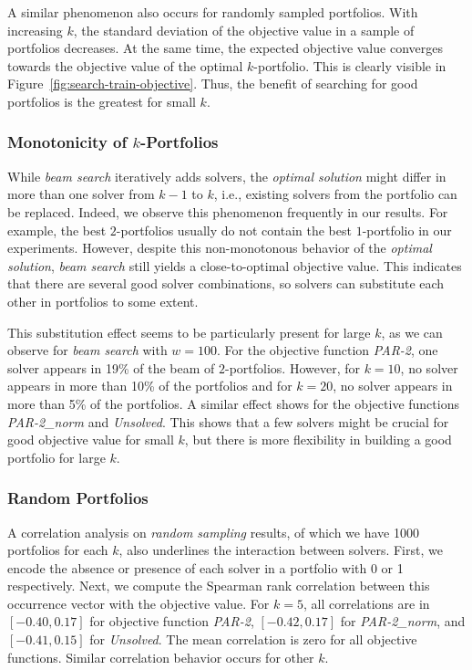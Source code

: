 \documentclass[conference]{IEEEtran}
\begin{document}
A similar phenomenon also occurs for randomly sampled portfolios. 
With increasing $k$, the standard deviation of the objective value in a sample of portfolios decreases.
At the same time, the expected objective value converges towards the objective value of the optimal $k$-portfolio.
This is clearly visible in Figure~\ref{fig:search-train-objective}.
Thus, the benefit of searching for good portfolios is the greatest for small $k$.

\subsubsection{Monotonicity of $k$-Portfolios}

While \emph{beam search} iteratively adds solvers, the \emph{optimal solution} might differ in more than one solver from $k-1$ to $k$, i.e., existing solvers from the portfolio can be replaced.
Indeed, we observe this phenomenon frequently in our results.
For example, the best $2$-portfolios usually do not contain the best $1$-portfolio in our experiments.
However, despite this non-monotonous behavior of the \emph{optimal solution}, \emph{beam search} still yields a close-to-optimal objective value.
This indicates that there are several good solver combinations, so solvers can substitute each other in portfolios to some extent.

This substitution effect seems to be particularly present for large $k$, as we can observe for \emph{beam search} with $w=100$. 
For the objective function \emph{PAR-2}, one solver appears in 19\% of the beam of $2$-portfolios.
However, for $k=10$, no solver appears in more than 10\% of the portfolios and for $k=20$, no solver appears in more than 5\% of the portfolios.
A similar effect shows for the objective functions \emph{PAR-2\_norm} and \emph{Unsolved}.
This shows that a few solvers might be crucial for good objective value for small $k$, but there is more flexibility in building a good portfolio for large $k$.

\subsubsection{Random Portfolios}

A correlation analysis on \emph{random sampling} results, of which we have 1000 portfolios for each $k$, also underlines the interaction between solvers.
First, we encode the absence or presence of each solver in a portfolio with 0 or 1 respectively.
Next, we compute the Spearman rank correlation between this occurrence vector with the objective value.
For $k=5$, all correlations are in $[-0.40,0.17]$ for objective function \emph{PAR-2}, $[-0.42,0.17]$ for \emph{PAR-2\_norm}, and $[-0.41,0.15]$ for \emph{Unsolved}.
The mean correlation is zero for all objective functions.
Similar correlation behavior occurs for other $k$.
\end{document}
